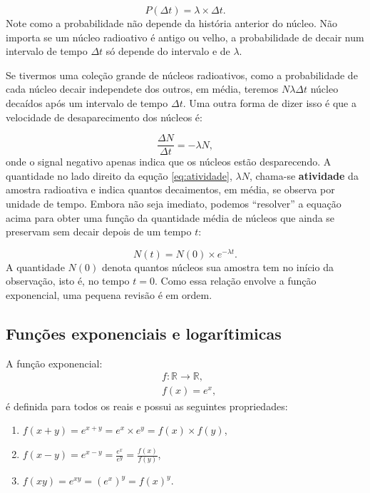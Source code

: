 \documentclass{article}
\begin{document}
\begin{equation}
P(\Delta t) = \lambda\times \Delta t.
\end{equation}
Note como a probabilidade n\~ao depende da hist\'oria anterior do n\'ucleo. N\~ao importa se um n\'ucleo radioativo \'e antigo ou velho, a probabilidade de decair num intervalo de tempo $\Delta t$ s\'o depende do intervalo e de $\lambda$.

Se tivermos uma cole\c c\~ao grande de n\'ucleos radioativos, como a probabilidade de cada n\'ucleo decair independete dos outros, em m\'edia, teremos $N \lambda \Delta t$ n\'ucleo deca\'idos ap\'os um intervalo de tempo $\Delta t$. Uma outra forma de dizer isso \'e que a velocidade de desaparecimento dos n\'ucleos \'e:

\begin{equation}\label{eq:atividade}
\frac{\Delta N}{\Delta t} = -\lambda N,
\end{equation}
onde o signal negativo apenas indica que os n\'ucleos est\~ao desparecendo. A quantidade no lado direito da equ\c c\~ao \eqref{eq:atividade}, $\lambda N$, chama-se \textbf{atividade} da amostra radioativa e indica quantos decaimentos, em m\'edia, se observa por unidade de tempo. Embora n\~ao seja imediato, podemos ``resolver'' a equa\c c\~ao acima para obter uma fun\c c\~ao da quantidade m\'edia de n\'ucleos que ainda se preservam sem decair depois de um tempo $t$:

\begin{equation}\label{eq:decay}
N(t) = N(0)\times e^{-\lambda t}.
\end{equation}
A quantidade $N(0)$ denota quantos n\'ucleos sua amostra tem no in\'icio da observa\c c\~ao, isto \'e, no tempo $t=0$. Como essa rela\c c\~ao envolve a fun\c c\~ao exponencial, uma pequena revis\~ao \'e em ordem.

\subsection{Fun\c c\~oes exponenciais e logar\'itimicas}

A fun\c c\~ao exponencial:
\begin{equation}
\begin{split}
&f:\mathbb{R}\rightarrow \mathbb{R},\\
&f(x) = e^x,
\end{split}
\end{equation}
\'e definida para todos os reais e possui as seguintes propriedades:

\begin{enumerate}
\item $f(x+y)= e^{x+y} = e^x\times e^y = f(x)\times f(y)$,
\item $f(x-y) = e^{x-y}= \frac{e^x}{e^y} = \frac{f(x)}{f(y)}$,
\item $f(xy) = e^{xy} = (e^x)^y = f(x)^y$.
\end{enumerate}
\end{document}
